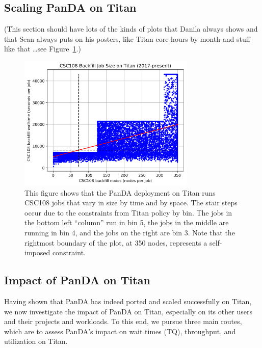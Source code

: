 \subsection{Scaling PanDA on Titan}
\label{subsec:scaling}

(This section should have lots of the kinds of plots that Danila always shows
and that Sean always puts on his posters, like Titan core hours by month and
stuff like that \ldots see Figure~\ref{fig:time-vs-nodes}.)

\begin{figure}
  \includegraphics[width=0.75\textwidth]{images/time-vs-nodes-backfill.png}
\caption{This figure shows that the PanDA deployment on Titan runs CSC108 jobs
that vary in size by time and by space. The stair steps occur due to the
constraints from Titan policy by bin. The jobs in the bottom left ``column''
run in bin 5, the jobs in the middle are running in bin 4, and the jobs on the
right are bin 3. Note that the rightmost boundary of the plot, at 350 nodes,
represents a self-imposed constraint.}
\label{fig:time-vs-nodes}
\end{figure}






\subsection{Impact of PanDA on Titan}
\label{subsec:impact}

Having shown that PanDA has indeed ported and scaled successfully on Titan, we
now investigate the impact of PanDA on Titan, especially on its other users
and their projects and workloads. To this end, we pursue three main routes,
which are to assess PanDA's impact on wait times (TQ), throughput, and
utilization on Titan.




